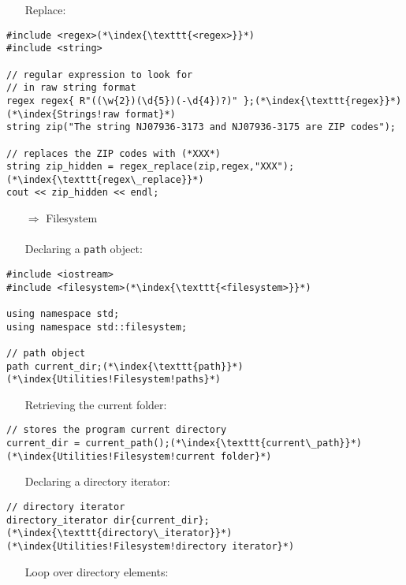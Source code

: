 \documentclass[10pt]{article}
\begin{document}
\begin{enumerate}
\item[] Replace:
\end{enumerate}
\begin{lstlisting}
#include <regex>(*\index{\texttt{<regex>}}*)
#include <string>

// regular expression to look for
// in raw string format 
regex regex{ R"((\w{2})(\d{5})(-\d{4})?)" };(*\index{\texttt{regex}}*)(*\index{Strings!raw format}*)
string zip("The string NJ07936-3173 and NJ07936-3175 are ZIP codes");

// replaces the ZIP codes with (*XXX*)
string zip_hidden = regex_replace(zip,regex,"XXX");(*\index{\texttt{regex\_replace}}*)
cout << zip_hidden << endl;
\end{lstlisting}
\begin{enumerate}
\item[$\Rightarrow$] Filesystem\\ \\ Declaring a \texttt{path} object:
\end{enumerate}
\begin{lstlisting}
#include <iostream>
#include <filesystem>(*\index{\texttt{<filesystem>}}*)

using namespace std;
using namespace std::filesystem;

// path object
path current_dir;(*\index{\texttt{path}}*)(*\index{Utilities!Filesystem!paths}*)
\end{lstlisting}
\begin{enumerate}
\item[] Retrieving the current folder:
\end{enumerate}
\begin{lstlisting}    
// stores the program current directory
current_dir = current_path();(*\index{\texttt{current\_path}}*)(*\index{Utilities!Filesystem!current folder}*)
\end{lstlisting}
\begin{enumerate}
\item[] Declaring a directory iterator:
\end{enumerate}
\begin{lstlisting}    
// directory iterator
directory_iterator dir{current_dir};(*\index{\texttt{directory\_iterator}}*)(*\index{Utilities!Filesystem!directory iterator}*)
\end{lstlisting}
\begin{enumerate}
\item[] Loop over directory elements:
\end{enumerate}
\end{document}
